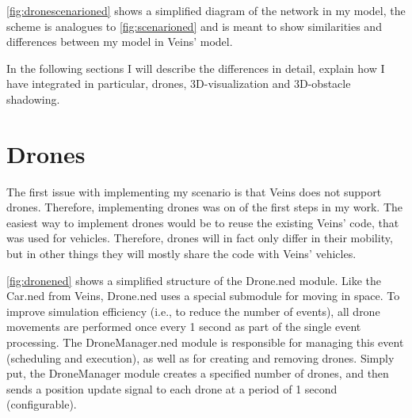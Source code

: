 \documentclass[]{nsm-thesis}
\begin{document}
\cref{fig:dronescenarioned} shows a simplified diagram of the network in my model, the scheme is analogues to \cref{fig:scenarioned} and is meant to show similarities and differences between my model in Veins' model.

In the following sections I will describe the differences in detail, explain how I have integrated in particular, drones, 3D-visualization and 3D-obstacle shadowing.

\section{Drones}

The first issue with implementing my scenario is that Veins does not support drones. Therefore, implementing drones was on of the first steps in my work. The easiest way to implement drones would be to reuse the existing Veins' code, that was used for vehicles. Therefore, drones will in fact only differ in their mobility, but in other things they will mostly share the code with Veins' vehicles.

\cref{fig:dronened} shows a simplified structure of the Drone.ned module. Like the Car.ned from Veins, Drone.ned uses a special submodule for moving in space. To improve simulation efficiency (i.e., to reduce the number of events), all drone movements are performed once every 1 second as part of the single event processing. The DroneManager.ned module is responsible for managing this event (scheduling and execution), as well as for creating and removing drones. Simply put, the DroneManager module creates a specified number of drones, and then sends a position update signal to each drone at a period of 1 second (configurable). 
\end{document}
